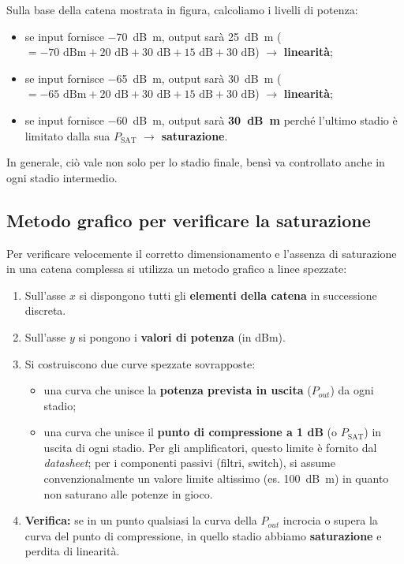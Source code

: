 \documentclass[openany,a4paper,12pt]{book}
\begin{document}
Sulla base della catena mostrata in figura, calcoliamo i livelli di potenza:
\begin{itemize}[label=\textcolor{PoliBlue}{\textbullet}]
    \item se input fornisce \qty{-70}{\deci\bel m}, output sarà \qty{+25}{\deci\bel m} ($=-70 \text{ dBm} + 20 \text{ dB} + 30 \text{ dB} + 15 \text{ dB} + 30 \text{ dB}$) $\rightarrow$ \textbf{linearità};
    \item se input fornisce \qty{-65}{\deci\bel m}, output sarà \qty{+30}{\deci\bel m} ($=-65 \text{ dBm} + 20 \text{ dB} + 30 \text{ dB} + 15 \text{ dB} + 30 \text{ dB}$) $\rightarrow$ \textbf{linearità};
    \item se input fornisce \qty{-60}{\deci\bel m}, output sarà \textbf{\qty{+30}{\deci\bel m}} perché l'ultimo stadio è limitato dalla sua $P_{\text{SAT}}$ $\rightarrow$ \textbf{\textcolor{OpticRed}{saturazione}}.
\end{itemize}
In generale, ciò vale non solo per lo stadio finale, bensì va controllato anche in ogni stadio intermedio.

\subsection*{Metodo grafico per verificare la saturazione}

Per verificare velocemente il corretto dimensionamento e l'assenza di saturazione in una catena complessa si utilizza un metodo grafico a linee spezzate:
\begin{enumerate}
    \item Sull'asse $x$ si dispongono tutti gli \textbf{elementi della catena} in successione discreta.
    \item Sull'asse $y$ si pongono i \textbf{valori di potenza} (in dBm).
    \item Si costruiscono due curve spezzate sovrapposte:
    \begin{itemize}[label=\textcolor{ForestGreen}{$\circ$}]
        \item una curva che unisce la \textbf{potenza prevista in uscita} ($P_{out}$) da ogni stadio;
        \item una curva che unisce il \textbf{punto di compressione a 1 dB} (o $P_{\text{SAT}}$) in uscita di ogni stadio. Per gli amplificatori, questo limite è fornito dal \textit{datasheet}; per i componenti passivi (filtri, switch), si assume convenzionalmente un valore limite altissimo (es. \qty{100}{\deci\bel m}) in quanto non saturano alle potenze in gioco.
    \end{itemize}
    \item \textbf{Verifica:} se in un punto qualsiasi la curva della $P_{out}$ incrocia o supera la curva del punto di compressione, in quello stadio abbiamo \textbf{saturazione} e perdita di linearità.
\end{enumerate}
\end{document}
